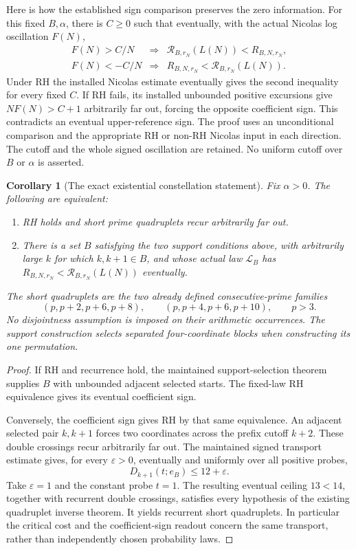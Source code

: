 \documentclass[11pt]{article}
\newtheorem{corollary}[theorem]{Corollary}
\theoremstyle{definition}
\begin{document}
Here is how the established sign comparison preserves the zero
information. For this fixed $B,\alpha$, there is $C\ge0$ such
that eventually, with the actual Nicolas log oscillation $F(N)$,
\[
 \begin{array}{rcl}
 F(N)>C/N&\Longrightarrow&
       \mathcal R_{B,r_N}(L(N))<R_{B,N,r_N},\\
 F(N)<-C/N&\Longrightarrow&
       R_{B,N,r_N}<\mathcal R_{B,r_N}(L(N)).
 \end{array}
\]
Under RH the installed Nicolas estimate eventually gives the
second inequality for every fixed $C$. If RH fails, its installed
unbounded positive excursions give $N F(N)>C+1$ arbitrarily far
out, forcing the opposite coefficient sign. This contradicts an
eventual upper-reference sign. The proof uses an unconditional
comparison and the appropriate RH or non-RH Nicolas input in
each direction. The cutoff and the whole signed oscillation are
retained. No uniform cutoff over $B$ or $\alpha$ is asserted.

\begin{corollary}[The exact existential constellation statement]
Fix $\alpha>0$. The following are equivalent:
\begin{enumerate}
\item RH holds and short prime quadruplets recur arbitrarily far out.
\item There is a set $B$ satisfying the two support conditions above,
with arbitrarily large $k$ for which $k,k+1\in B$, and whose
actual law $\mathcal L_B$ has
$R_{B,N,r_N}<\mathcal R_{B,r_N}(L(N))$ eventually.
\end{enumerate}
The short quadruplets are the two already defined consecutive-prime
families
\[
 (p,p+2,p+6,p+8),\qquad (p,p+4,p+6,p+10),\qquad p>3.
\]
No disjointness assumption is imposed on their arithmetic
occurrences. The support construction selects separated
four-coordinate blocks when constructing its one permutation.
\end{corollary}

\begin{proof}
If RH and recurrence hold, the maintained support-selection theorem
supplies $B$ with unbounded adjacent selected starts. The fixed-law
RH equivalence gives its eventual coefficient sign.

Conversely, the coefficient sign gives RH by that same equivalence.
An adjacent selected pair $k,k+1$ forces two coordinates across the
prefix cutoff $k+2$. These double crossings recur arbitrarily far
out. The maintained signed transport estimate gives, for every
$\varepsilon>0$, eventually and uniformly over all positive probes,
\[
 D_{k+1}(t;e_B)\le12+\varepsilon.
\]
Take $\varepsilon=1$ and the constant probe $t=1$. The resulting
eventual ceiling $13<14$, together with recurrent double crossings,
satisfies every hypothesis of the existing quadruplet inverse
theorem. It yields recurrent short quadruplets. In particular the
critical cost and the coefficient-sign readout concern the same
transport, rather than independently chosen probability laws.
\end{proof}
\end{document}

